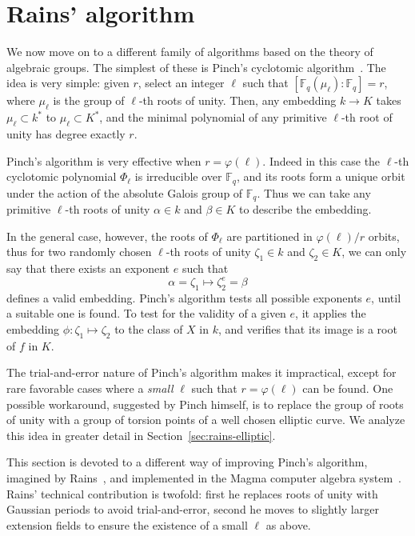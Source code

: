 \documentclass{mcom-l}
\theoremstyle{plain}
\theoremstyle{definition}
\newcommand{\F}{\ensuremath{\mathbb{F}}}
\newcommand{\euler}{\ensuremath{\varphi}}
\newcounter{algorithm}
\begin{document}
\section{Rains' algorithm}
\label{sec:rains-algorithm}

We now move on to a different family of algorithms based on the theory of
algebraic groups. The simplest of these is Pinch's
cyclotomic algorithm~\cite{Pinch}. The idea is very simple: given $r$,
select an integer $\ell$ such that $[\F_q(\mu_\ell):\F_q]=r$, where
$\mu_\ell$ is the group of $\ell$-th roots of unity.  Then, any
embedding $k\to K$ takes $\mu_\ell\subset k^\ast$ to $\mu_\ell\subset
K^\ast$, and the minimal polynomial of any primitive $\ell$-th root of
unity has degree exactly $r$.

Pinch's algorithm is very effective when $r=\euler(\ell)$. Indeed in
this case the $\ell$-th cyclotomic polynomial $\Phi_\ell$ is
irreducible over $\F_q$, and its roots form a unique orbit under the
action of the absolute Galois group of $\F_q$. Thus we can take any
primitive $\ell$-th roots of unity $\alpha\in k$ and $\beta\in K$ to
describe the embedding.

In the general case, however, the roots of $\Phi_\ell$ are partitioned
in $\euler(\ell)/r$ orbits, thus for two randomly chosen $\ell$-th
roots of unity $\zeta_1\in k$ and $\zeta_2\in K$, we can only say that
there exists an exponent $e$ such that
\begin{equation*}
  \alpha = \zeta_1 \mapsto \zeta_2^e = \beta
\end{equation*}
defines a valid embedding. Pinch's algorithm tests all possible
exponents $e$, until a suitable one is found. To test for the validity
of a given $e$, it applies the embedding $\phi:\zeta_1\mapsto\zeta_2$
to the class of $X$ in $k$, and verifies that its image is a root of
$f$ in $K$.

The trial-and-error nature of Pinch's algorithm makes it impractical,
except for rare favorable cases where a \emph{small} $\ell$ such that
$r=\euler(\ell)$ can be found. One possible workaround, suggested by
Pinch himself, is to replace the group of roots of unity with a group
of torsion points of a well chosen elliptic curve. We analyze this
idea in greater detail in Section~\ref{sec:rains-elliptic}.

This section is devoted to a different way of improving Pinch's
algorithm, imagined by Rains~\cite{rains2008}, and implemented in the
Magma computer algebra system~\cite{MAGMA}. Rains' technical
contribution is twofold: first he replaces roots of unity with
Gaussian periods to avoid trial-and-error, second he moves to slightly
larger extension fields to ensure the existence of a small $\ell$ as
above.
\end{document}
